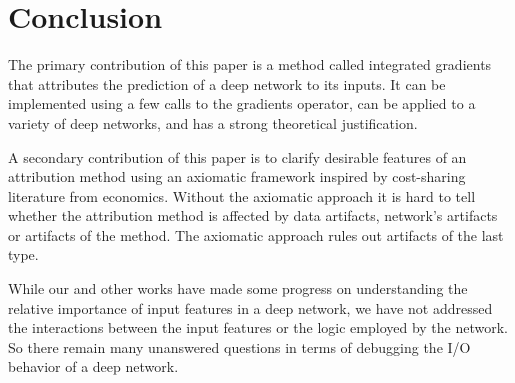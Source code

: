 \section{Conclusion}

The primary contribution of this paper is a method called integrated
gradients that attributes the prediction of a deep network to its
inputs. It can be implemented using a few calls to the gradients
operator, can be applied to a variety of deep networks, and has a
strong theoretical justification.

A secondary contribution of this paper is to clarify desirable
features of an attribution method using an axiomatic framework
inspired by cost-sharing literature from economics. Without the
axiomatic approach it is hard to tell whether the 
attribution method is affected by data artifacts, network's artifacts or
artifacts of the method. The axiomatic approach rules out
artifacts of the last type.

While our and other works have made some progress on understanding
the relative importance of input features in a deep network,
we have not addressed the interactions between the input features or
the logic employed by the network. So there remain many unanswered
questions in terms of debugging the I/O behavior of a deep
network.

